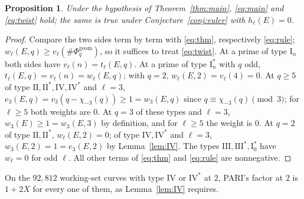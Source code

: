 \documentclass[11pt]{amsart}
\newtheorem{proposition}[theorem]{Proposition}
\theoremstyle{definition}
\newcommand{\Phig}{\Phi^{\mathrm{geom}}}
\begin{document}
\begin{proposition}\label{prop:forms}
Under the hypothesis of Theorem~\ref{thm:main}, \eqref{eq:main} and \eqref{eq:twist} hold; the same is true under Conjecture~\ref{conj:euler} with $h_\ell(E)=0$.
\end{proposition}
\begin{proof}
Compare the two sides term by term with \eqref{eq:thm}, respectively \eqref{eq:rule}; $w_\ell(E,q)\ge v_\ell(\#\Phig_q)$, so it suffices to treat \eqref{eq:twist}. At a prime of type $\mathrm{I}_n$ both sides have $v_\ell(n)=t_\ell(E,q)$. At a prime of type $\mathrm{I}_n^*$ with $q$ odd, $t_\ell(E,q)=v_\ell(n)=w_\ell(E,q)$; with $q=2$, $w_\ell(E,2)=v_\ell(4)=0$. At $q\ge5$ of type $\mathrm{II},\mathrm{II}^*,\mathrm{IV},\mathrm{IV}^*$ and $\ell=3$, $e_3(E,q)=v_3(q-\chi_{-3}(q))\ge1=w_3(E,q)$ since $q\equiv\chi_{-3}(q)\pmod3$; for $\ell\ge5$ both weights are $0$. At $q=3$ of these types and $\ell=3$, $w_3(E)\ge1=w_3(E,3)$ by definition, and for $\ell\ge5$ the weight is $0$. At $q=2$ of type $\mathrm{II},\mathrm{II}^*$, $w_\ell(E,2)=0$; of type $\mathrm{IV},\mathrm{IV}^*$ and $\ell=3$, $w_3(E,2)=1=e_3(E,2)$ by Lemma~\ref{lem:IV}. The types $\mathrm{III},\mathrm{III}^*,\mathrm{I}_0^*$ have $w_\ell=0$ for odd $\ell$. All other terms of \eqref{eq:thm} and \eqref{eq:rule} are nonnegative.
\end{proof}
On the $92{,}812$ working-set curves with type $\mathrm{IV}$ or $\mathrm{IV}^*$ at $2$, PARI's factor at $2$ is $1+2X$ for every one of them, as Lemma~\ref{lem:IV} requires.
\end{document}

